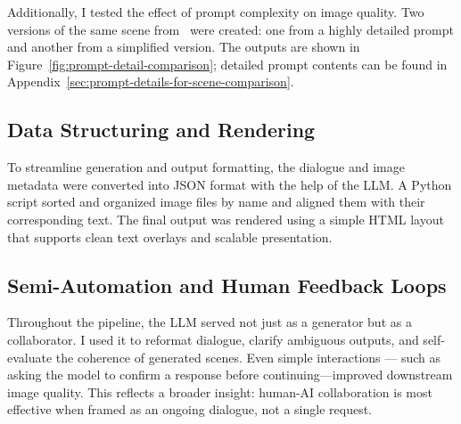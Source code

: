 Additionally, I tested the effect of prompt complexity on image quality.
Two versions of the same scene from~\cite{wilson2024towards} were created:
one from a highly detailed prompt and another from a simplified version.
The outputs are shown in Figure~\ref{fig:prompt-detail-comparison};
detailed prompt contents can be found in Appendix~\ref{sec:prompt-details-for-scene-comparison}.

\subsection{Data Structuring and Rendering}\label{subsec:data-structuring-and-rendering}

To streamline generation and output formatting, the dialogue and image metadata were converted into
JSON format with the help of the LLM\@.
A Python script sorted and organized image files by name and aligned them with their corresponding text.
The final output was rendered using a simple HTML layout that supports clean text overlays and scalable presentation.

\subsection{Semi-Automation and Human Feedback Loops}\label{subsec:semi-automation-and-human-feedback-loops}

Throughout the pipeline, the LLM served not just as a generator but as a collaborator.
I used it to reformat dialogue, clarify ambiguous outputs, and self-evaluate the coherence of generated scenes.
Even simple interactions --- such as asking the model to confirm a response before continuing—improved downstream image quality.
This reflects a broader insight: human-AI collaboration is most effective when framed as an ongoing dialogue, not a single request.
